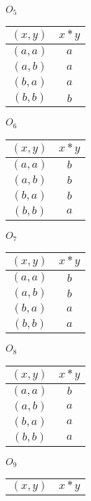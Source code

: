 \documentclass[12pt]{article}
\begin{document}
\begin{enumerate}
\begin{minipage}[h]{.25\textwidth}
    	\end{minipage} 
      \begin{minipage}[h]{.25\textwidth}
				$O_5$
    		\begin{tabular}{ c | c }
      		$(x,y)$ & $x*y$ \\
        	\hline
        	$(a,a)$ & $a$ \\
        	$(a,b)$ & $a$ \\
        	$(b,a)$ & $a$ \\
        	$(b,b)$ & $b$
      	\end{tabular}
    	\end{minipage}
    	\bigskip
      \begin{minipage}[h]{.25\textwidth}
				$O_6$
    		\begin{tabular}{ c | c }
      		$(x,y)$ & $x*y$ \\
        	\hline
        	$(a,a)$ & $b$ \\
        	$(a,b)$ & $b$ \\
        	$(b,a)$ & $b$ \\
        	$(b,b)$ & $a$
      	\end{tabular}
    	\end{minipage} 	
    	\begin{minipage}[h]{.25\textwidth}
				$O_7$
    		\begin{tabular}{ c | c }
      		$(x,y)$ & $x*y$ \\
        	\hline
        	$(a,a)$ & $b$ \\
        	$(a,b)$ & $b$ \\
        	$(b,a)$ & $a$ \\
        	$(b,b)$ & $a$
      	\end{tabular}
    	\end{minipage}
    	\begin{minipage}[h]{.25\textwidth}
				$O_8$
    		\begin{tabular}{ c | c }
      		$(x,y)$ & $x*y$ \\
        	\hline
        	$(a,a)$ & $b$ \\
        	$(a,b)$ & $a$ \\
        	$(b,a)$ & $a$ \\
        	$(b,b)$ & $a$
      	\end{tabular}
    	\end{minipage}
    	\begin{minipage}[h]{.25\textwidth}
				$O_9$
    		\begin{tabular}{ c | c }
      		$(x,y)$ & $x*y$ \\

\end{tabular}
\end{minipage}
\end{enumerate}
\end{document}
